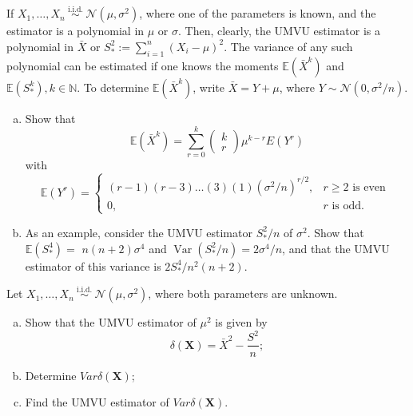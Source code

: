 \begin{ex}
    If \(X_{1}, \ldots, X_{n} \stackrel{\text { i.i.d. }}{\sim} \mathcal{N}\left(\mu, \sigma^{2}\right)\), where one of the parameters is known, and the estimator is a polynomial in \(\mu\) or \(\sigma\). Then, clearly, the UMVU estimator is a polynomial in \(\bar{X}\) or \(S_{*}^{2}:=\sum_{i=1}^{n}\left(X_{i}-\mu\right)^{2}\). The variance of any such polynomial can be estimated if one knows the moments \(\mathbb{E}\left(\bar{X}^{k}\right)\) and \(\mathbb{E}\left(S_{*}^{k}\right), k \in \mathbb{N}\). To determine \(\mathbb{E}\left(\bar{X}^{k}\right)\), write \(\bar{X}=Y+\mu\), where \(Y \sim \mathcal{N}\left(0, \sigma^{2} / n\right) .\)
    \begin{enumerate}[(a)]
        \item Show that
        \[
        \mathbb{E}\left(\bar{X}^{k}\right)=\sum_{r=0}^{k}\left(\begin{array}{l}
        k \\
        r
        \end{array}\right) \mu^{k-r} E\left(Y^{r}\right)
        \]
        with
        \[
        \mathbb{E}\left(Y^{r}\right)=\left\{\begin{array}{cc}
        (r-1)(r-3) \ldots(3)(1)\left(\sigma^{2} / n\right)^{r / 2}, & r \geq 2 \text { is even } \\
        0, & r \text { is odd. }
        \end{array}\right.
        \]
        \item As an example, consider the UMVU estimator \(S_{*}^{2} / n\) of \(\sigma^{2}\). Show that \(\mathbb{E}\left(S_{*}^{4}\right)=\) \(n(n+2) \sigma^{4}\) and \(\operatorname{Var}\left(S_{*}^{2} / n\right)=2 \sigma^{4} / n\), and that the UMVU estimator of this variance is \(2 S_{*}^{4} / n^{2}(n+2)\).
    \end{enumerate}
\end{ex}

\begin{solution}
    
\end{solution}

\begin{ex}
    Let \(X_{1}, \ldots, X_{n} \stackrel{\text { i.i.d. }}{\sim} \mathcal{N}\left(\mu, \sigma^{2}\right)\), where both parameters are unknown. 
    \begin{enumerate}[(a)]
        \item Show that the UMVU estimator of \(\mu^{2}\) is given by
        \[
        \delta(\mathbf{X})=\bar{X}^{2}-\frac{S^{2}}{n}; 
        \]
        \item Determine \(Var\delta(\mathbf{X})\); 
        \item Find the UMVU estimator of \(Var \delta(\mathbf{X})\). 
    \end{enumerate}
\end{ex}

